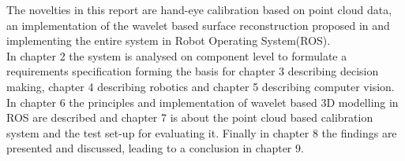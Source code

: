 The novelties in this report are hand-eye calibration based on point cloud data, an implementation of the wavelet based surface reconstruction proposed in \cite{Someone wielding the wavelet hammer...} and implementing the entire system in Robot Operating System(ROS).\\

In chapter 2 the system is analysed on component level to formulate a requirements specification forming the basis for chapter 3 describing decision making, chapter 4 describing robotics and chapter 5 describing computer vision. In chapter 6 the principles and implementation of wavelet based 3D modelling in ROS are described and chapter 7 is about the point cloud based calibration system and the test set-up for evaluating it. Finally in chapter 8 the findings are presented and discussed, leading to a conclusion in chapter 9.